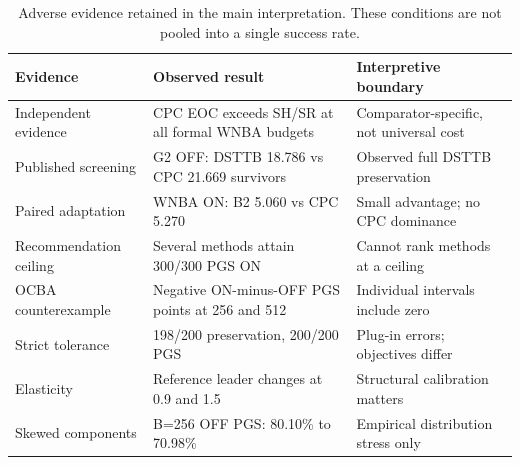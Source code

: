 \begin{table}[tbp]\centering\footnotesize
\caption{Adverse evidence retained in the main interpretation. These conditions are not pooled into a single success rate.}\label{tab:adverse}
\begin{tabularx}{\linewidth}{XXX}\toprule
Evidence & Observed result & Interpretive boundary \\ \midrule
Independent evidence & CPC EOC exceeds SH/SR at all formal WNBA budgets & Comparator-specific, not universal cost \\
Published screening & G2 OFF: DSTTB 18.786 vs CPC 21.669 survivors & Observed full DSTTB preservation \\
Paired adaptation & WNBA ON: B2 5.060 vs CPC 5.270 & Small advantage; no CPC dominance \\
Recommendation ceiling & Several methods attain 300/300 PGS ON & Cannot rank methods at a ceiling \\
OCBA counterexample & Negative ON-minus-OFF PGS points at 256 and 512 & Individual intervals include zero \\
Strict tolerance & 198/200 preservation, 200/200 PGS & Plug-in errors; objectives differ \\
Elasticity & Reference leader changes at 0.9 and 1.5 & Structural calibration matters \\
Skewed components & B=256 OFF PGS: 80.10\% to 70.98\% & Empirical distribution stress only \\
\bottomrule\end{tabularx}
\end{table}
